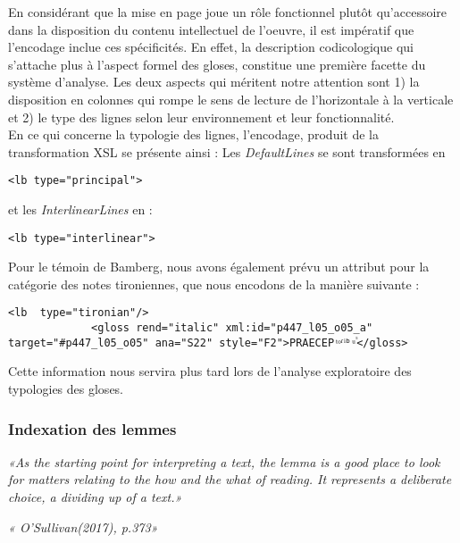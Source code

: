 \documentclass[a4paper, twoside, 12pt]{book}
\begin{document}
En considérant que la mise en page joue un rôle fonctionnel plutôt qu'accessoire dans la disposition du contenu intellectuel de l'oeuvre, il est impératif que l'encodage inclue ces spécificités. En effet, la description
\og{} codicologique \fg{} qui s’attache plus à l’aspect formel des gloses, constitue une première facette du système d'analyse. Les deux aspects qui méritent notre attention sont 1) la disposition en colonnes qui rompe le sens de lecture de l'horizontale à la verticale et 2) le type des lignes selon leur environnement et leur fonctionnalité.\\

En ce qui concerne la typologie des lignes, l'encodage, produit de la transformation XSL se présente ainsi : Les \textit{DefaultLines} se sont transformées en 
\begin{verbatim} 
<lb type="principal"> 
\end{verbatim}
et les \textit{InterlinearLines} en :
\begin{verbatim} 
<lb type="interlinear">
\end{verbatim}

Pour le témoin de Bamberg, nous avons également prévu un attribut pour la catégorie des notes tironiennes, que nous encodons de la manière suivante : 

\begin{verbatim}
<lb  type="tironian"/>
             <gloss rend="italic" xml:id="p447_l05_o05_a" target="#p447_l05_o05" ana="S22" style="F2">PRAECEP ͭ ͦ ͬ ͥᵇ ͧ ᷤ</gloss>
\end{verbatim}

Cette information nous servira plus tard lors de l'analyse exploratoire des typologies des gloses.

\subsubsection{Indexation des lemmes}


\begin{flushright}\textit{ «As the starting point for interpreting a text, the lemma is a good place to look for matters relating to the how and the what of reading. It represents a deliberate choice, a dividing up of a text.» }\end{flushright}

\begin{flushright}\textit{ « O'Sullivan(2017), p.373» }\end{flushright}
\end{document}

